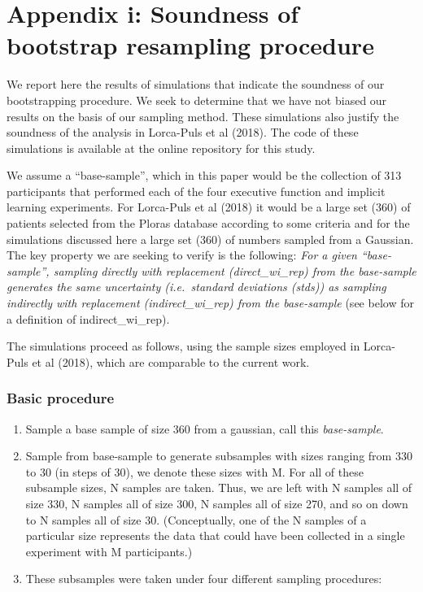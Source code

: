 \documentclass[
]{article}
\author{}
\date{\vspace{-2.5em}}
\providecommand{\tightlist}{%
  \setlength{\itemsep}{0pt}\setlength{\parskip}{0pt}}
\begin{document}
\section{Appendix i: Soundness of bootstrap resampling
procedure}\label{appendix-i-soundness-of-bootstrap-resampling-procedure}

We report here the results of simulations that indicate the soundness of
our bootstrapping procedure. We seek to determine that we have not
biased our results on the basis of our sampling method. These
simulations also justify the soundness of the analysis in Lorca-Puls et
al (2018). The code of these simulations is available at the online
repository for this study.

We assume a ``base-sample'', which in this paper would be the collection
of 313 participants that performed each of the four executive function
and implicit learning experiments. For Lorca-Puls et al (2018) it would
be a large set (360) of patients selected from the Ploras database
according to some criteria and for the simulations discussed here a
large set (360) of numbers sampled from a Gaussian. The key property we
are seeking to verify is the following: \emph{For a given
``base-sample'', sampling directly with replacement (direct\_wi\_rep)
from the base-sample generates the same uncertainty (i.e.~standard
deviations (stds)) as sampling indirectly with replacement
(indirect\_wi\_rep) from the base-sample} (see below for a definition of
indirect\_wi\_rep).

The simulations proceed as follows, using the sample sizes employed in
Lorca-Puls et al (2018), which are comparable to the current work.

\subsubsection{Basic procedure}\label{basic-procedure}

\begin{enumerate}
\def\labelenumi{\arabic{enumi}.}
\tightlist
\item
  Sample a base sample of size 360 from a gaussian, call this
  \emph{base-sample}.
\item
  Sample from base-sample to generate subsamples with sizes ranging from
  330 to 30 (in steps of 30), we denote these sizes with M. For all of
  these subsample sizes, N samples are taken. Thus, we are left with N
  samples all of size 330, N samples all of size 300, N samples all of
  size 270, and so on down to N samples all of size 30. (Conceptually,
  one of the N samples of a particular size represents the data that
  could have been collected in a single experiment with M participants.)
\item
  These subsamples were taken under four different sampling procedures:
\end{enumerate}
\end{document}
